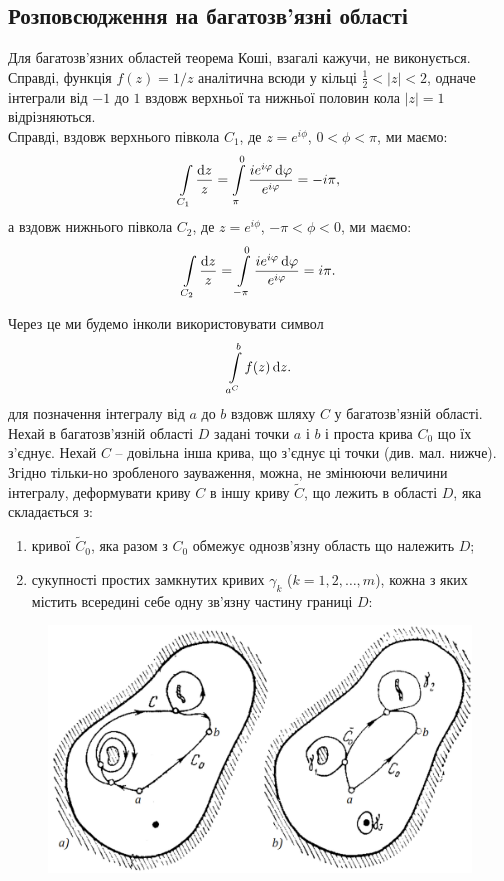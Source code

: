\subsection{Розповсюдження на багатозв'язні області}
Для багатозв'язних областей теорема Коші, взагалі кажучи, не виконується. Справді, функція $f(z) = 1 / z$ аналітична всюди у кільці $\frac{1}{2} < |z| < 2$, одначе інтеграли від $-1$ до $1$ вздовж верхньої та нижньої половин кола $|z| = 1$ відрізняються. \\

Справді, вздовж верхнього півкола $C_1$, де $z = e^{i \phi}$, $0 < \phi < \pi$, ми маємо:
\begin{equation}
	\label{eq:4.3.1}
	\displaystyle\int\limits_{C_1} \dfrac{\mathop{}\!\mathrm{d} z}{z} = \displaystyle\int\limits_\pi^0 \dfrac{i e^{i \varphi} \mathop{}\!\mathrm{d} \varphi}{e^{i \varphi}} = - i \pi,
\end{equation} а вздовж нижнього півкола $C_2$, де $z = e^{i \phi}$, $-\pi < \phi < 0$, ми маємо:
\begin{equation}
	\label{eq:4.3.2}
	\displaystyle\int\limits_{C_2} \dfrac{\mathop{}\!\mathrm{d} z}{z} = \displaystyle\int\limits_{-\pi}^0 \dfrac{i e^{i \varphi} \mathop{}\!\mathrm{d} \varphi}{e^{i \varphi}} = i \pi.
\end{equation}

Через це ми будемо інколи використовувати символ
\begin{equation}
	\label{eq:4.3.3}
	\displaystyle\int\limits_{a^C}^b f(z) \mathop{}\!\mathrm{d} z.
\end{equation}
для позначення інтегралу від $a$ до $b$ вздовж шляху $C$ у багатозв'язній області. \\

Нехай в багатозв'язній області $D$ задані точки $a$ і $b$ і проста крива $C_0$ що їх з'єднує. Нехай $C$ -- довільна інша крива, що з'єднує ці точки (див. мал. нижче). Згідно тільки-но зробленого зауваження, можна, не змінюючи величини інтегралу, деформувати криву $C$ в іншу криву $\widetilde{C}$, що лежить в області $D$, яка складається з:
\begin{enumerate}
\item кривої $\widetilde{C}_0$, яка разом з $C_0$ обмежує однозв'язну область що належить $D$;
\item сукупності простих замкнутих кривих $\gamma_k$ ($k = 1, 2, \ldots, m$), кожна з яких містить всередині себе одну зв'язну частину границі $D$:
\end{enumerate}

\begin{figure}[H]
	\centering
	\includegraphics[width=.8\linewidth]{mal-21.png}
\end{figure}

